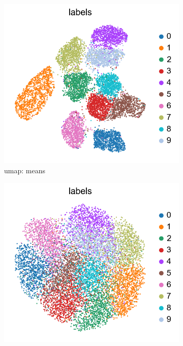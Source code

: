 \documentclass[11pt, a4paper]{report}
\theoremstyle{plain}
\theoremstyle{definition}
\theoremstyle{remark}
\begin{document}
\begin{figure}[!h]
\begin{framed}
\centering
\begin{subfigure}[t]{0.3\textwidth}
\includegraphics[width=\textwidth]{images/vae.umap.mnist.mu.png}
\caption{umap: means}
\label{fig:vaeumapmeans}
\end{subfigure}
\begin{subfigure}[t]{0.3\textwidth}
\includegraphics[width=\textwidth]{images/vae.umap.mnist.sampling.png}

\end{subfigure}
\end{framed}
\end{figure}
\end{document}
